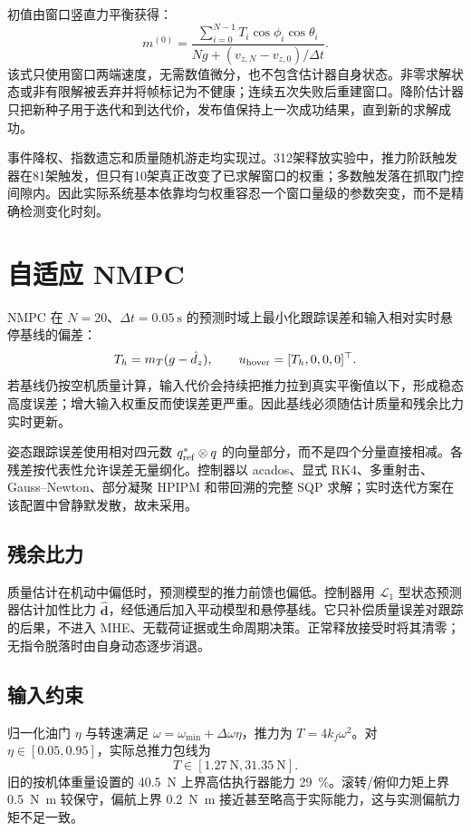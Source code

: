 \documentclass[11pt,UTF8,fontset=none]{ctexrep}
\providecommand{\mT}{m_T}
\begin{document}
初值由窗口竖直力平衡获得：
\begin{equation}
m^{(0)}=
\frac{\displaystyle\sum_{i=0}^{N-1}T_i\cos\phi_i\cos\theta_i}
{\displaystyle Ng+(v_{z,N}-v_{z,0})/\Delta t}.
\end{equation}
该式只使用窗口两端速度，无需数值微分，也不包含估计器自身状态。非零求解状态或非有限解被丢弃并将帧标记为不健康；连续五次失败后重建窗口。降阶估计器只把新种子用于迭代和到达代价，发布值保持上一次成功结果，直到新的求解成功。

事件降权、指数遗忘和质量随机游走均实现过。312架释放实验中，推力阶跃触发器在81架触发，但只有10架真正改变了已求解窗口的权重；多数触发落在抓取门控间隙内。因此实际系统基本依靠均匀权重容忍一个窗口量级的参数突变，而不是精确检测变化时刻。

\section{自适应 NMPC}

NMPC 在 $N=20$、$\Delta t=\SI{0.05}{\second}$ 的预测时域上最小化跟踪误差和输入相对实时悬停基线的偏差：
\begin{equation}
T_h=\mT(g-\hat d_z),\qquad u_{\rm hover}=[T_h,0,0,0]^\top.
\end{equation}
若基线仍按空机质量计算，输入代价会持续把推力拉到真实平衡值以下，形成稳态高度误差；增大输入权重反而使误差更严重。因此基线必须随估计质量和残余比力实时更新。

姿态跟踪误差使用相对四元数 $q_{\rm ref}^*\otimes q$ 的向量部分，而不是四个分量直接相减。各残差按代表性允许误差无量纲化。控制器以 acados、显式 RK4、多重射击、Gauss--Newton、部分凝聚 HPIPM 和带回溯的完整 SQP 求解；实时迭代方案在该配置中曾静默发散，故未采用。

\subsection{残余比力}

质量估计在机动中偏低时，预测模型的推力前馈也偏低。控制器用 $\mathcal L_1$ 型状态预测器估计加性比力 $\hat{\bm d}$，经低通后加入平动模型和悬停基线。它只补偿质量误差对跟踪的后果，不进入 MHE、无载荷证据或生命周期决策。正常释放接受时将其清零；无指令脱落时由自身动态逐步消退。

\subsection{输入约束}

归一化油门 $\eta$ 与转速满足 $\omega=\omega_{\min}+\Delta\omega\eta$，推力为 $T=4k_f\omega^2$。对 $\eta\in[0.05,0.95]$，实际总推力包线为
\begin{equation}
T\in[\SI{1.27}{\newton},\SI{31.35}{\newton}].
\end{equation}
旧的按机体重量设置的 \SI{40.5}{\newton} 上界高估执行器能力 \SI{29}{\percent}。滚转/俯仰力矩上界 \SI{0.5}{\newton\meter} 较保守，偏航上界 \SI{0.2}{\newton\meter} 接近甚至略高于实际能力，这与实测偏航力矩不足一致。
\end{document}
